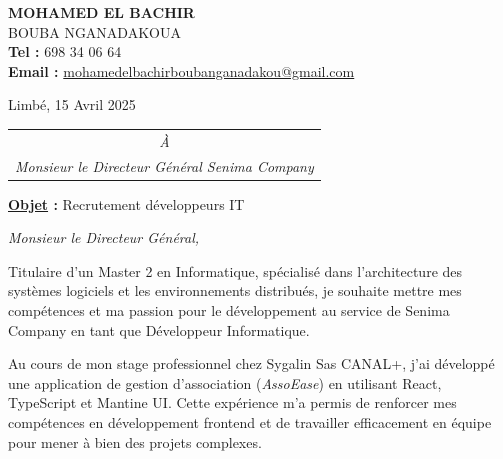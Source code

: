 \documentclass[12pt,a4paper]{letter}
\begin{document}
	
	\noindent
	\begin{minipage}[t]{0.65\textwidth}
		\textbf{MOHAMED EL BACHIR} \\[0.2em]
		BOUBA NGANADAKOUA \\[1em]
		\textbf{Tel :} 698 34 06 64 \\[0.5em]
		\textbf{Email :} \href{mailto:mohamedelbachirboubanganadakou@gmail.com}{mohamedelbachirboubanganadakou@gmail.com}\\
	\end{minipage}
	\hfill
	\begin{minipage}[t]{0.3\textwidth}
		\raggedleft
		Limbé, 15 Avril 2025
	\end{minipage}
	
	\vspace{0.5cm}
	
	\begin{FlushRight}
		\begin{minipage}[t]{0.6\textwidth}
			\begin{tabular}{c}
				\textit{À} \\
				\textit{Monsieur le Directeur Général Senima Company}
			\end{tabular}
		\end{minipage}
	\end{FlushRight}
	
	
	\vspace{1.5em}
	
	\noindent
	\textbf{\underline{Objet} :} Recrutement développeurs IT \\[1em]
	
	
	\justifying
	\begin{center}
		\textit{Monsieur le Directeur Général,}
	\end{center}
	
	
	\vspace{1em}
	
	\qquad Titulaire d’un Master 2 en Informatique, spécialisé dans l’architecture des systèmes logiciels et les environnements distribués, je souhaite mettre mes compétences et ma passion pour le développement au service de Senima Company en tant que Développeur Informatique.
	
	\qquad Au cours de mon stage professionnel chez Sygalin Sas CANAL+, j'ai développé une application de gestion d'association (\textit{AssoEase}) en utilisant React, TypeScript et Mantine UI. Cette expérience m'a permis de renforcer mes compétences en développement frontend et de travailler efficacement en équipe pour mener à bien des projets complexes.
	
\end{document}
